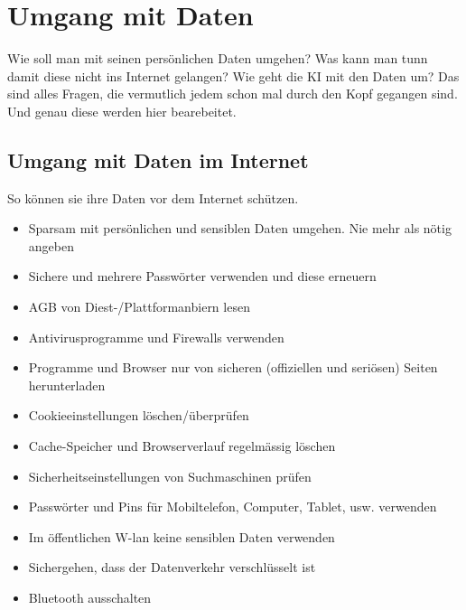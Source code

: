 \chapter{Umgang mit Daten}
\label{chap:daten}

Wie soll man mit seinen persönlichen Daten umgehen? Was kann man tunn damit diese nicht ins Internet gelangen? Wie geht die KI mit den Daten um?
Das  sind alles Fragen, die vermutlich jedem schon mal durch den Kopf gegangen sind. Und genau diese werden hier bearebeitet.

\section{Umgang mit Daten im Internet}
So können sie ihre Daten vor dem Internet schützen.

\begin{itemize}
    \item Sparsam mit persönlichen und sensiblen Daten umgehen. Nie mehr als nötig angeben
    \item Sichere und mehrere Passwörter verwenden und diese erneuern
    \item AGB von Diest-/Plattformanbiern lesen
    \item Antivirusprogramme und Firewalls verwenden
    \item Programme und Browser nur von sicheren (offiziellen und seriösen) Seiten herunterladen
    \item Cookieeinstellungen löschen/überprüfen
    \item Cache-Speicher und Browserverlauf regelmässig löschen
    \item Sicherheitseinstellungen von Suchmaschinen prüfen
    \item Passwörter und Pins für Mobiltelefon, Computer, Tablet, usw. verwenden
    \item Im öffentlichen W-lan keine sensiblen Daten verwenden
    \item Sichergehen, dass der Datenverkehr verschlüsselt ist
    \item Bluetooth ausschalten
\end{itemize}

\citep{datenschutz}